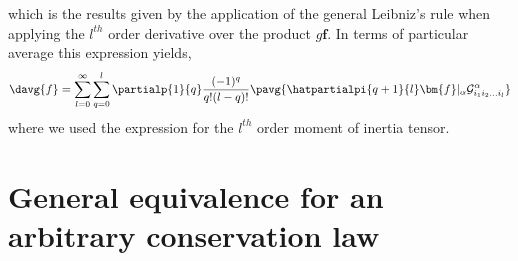 {\begin{equation*}
\end{equation*}
which is the results given by the application of the general Leibniz's rule when applying the $l^{th}$ order derivative over the product $g\bm{f}$.
In terms of particular average this expression yields,
\begin{equation}
    \davg{f}
    = \sum_{l=0}^\infty
    \sum_{q=0}^l \partialp{1}{q} \frac{(-1)^q}{q!(l-q)!}
    \pavg{\hatpartialpi{q+1}{l}\bm{f}|_\alpha \mathcal{G}^\alpha_{i_1i_2\ldots i_l}}
    \label{eq:doubleexpansion}
\end{equation}
where we used the expression for the $l^{th}$ order moment of inertia tensor. 
}

\section{General equivalence for an arbitrary conservation law}

